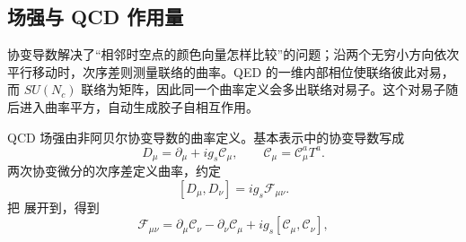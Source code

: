 \subsection{场强与 QCD 作用量}

协变导数解决了“相邻时空点的颜色向量怎样比较”的问题；沿两个无穷小方向依次平行移动时，次序差则测量联络的曲率。QED 的一维内部相位使联络彼此对易，而 $SU(N_c)$ 联络为矩阵，因此同一个曲率定义会多出联络对易子。这个对易子随后进入曲率平方，自动生成胶子自相互作用。

QCD 场强由非阿贝尔协变导数的曲率定义。基本表示中的协变导数写成
\begin{equation}
\boxed{
D_\mu=\partial_\mu+i g_s\mathscr C_\mu,
\qquad
\mathscr C_\mu=\mathscr C_\mu^aT^a.}
\label{eq:qcd-covariant-derivative-dp68}
\end{equation}
两次协变微分的次序差定义曲率，约定
\begin{equation}
\boxed{
[D_\mu,D_\nu]=i g_s\mathcal F_{\mu\nu}.}
\label{eq:qcd-curvature-definition-dp68}
\end{equation}
把 展开到，得到
\begin{equation}
\boxed{
\mathcal F_{\mu\nu}
=\partial_\mu\mathscr C_\nu-\partial_\nu\mathscr C_\mu
+i g_s[\mathscr C_\mu,\mathscr C_\nu],}
\label{eq:qcd-field-strength-matrix-dp10}
\end{equation}

